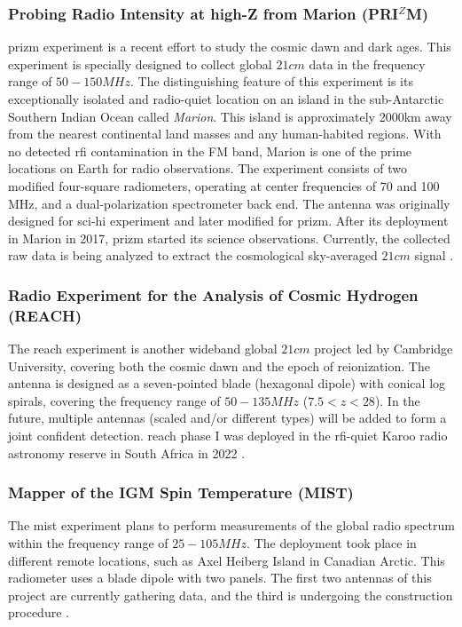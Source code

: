 \documentclass[12pt, TexShade, letterpaper]{report}
\begin{document}
\subsubsection{Probing Radio Intensity at high-Z from Marion (PRI$^Z$M)}
\gls{prizm} experiment is a recent effort to study the cosmic dawn and dark ages. This experiment is specially designed to collect global $21cm$ data in the frequency range of $50-150MHz$. The distinguishing feature of this experiment is its exceptionally isolated and radio-quiet location on an island in the sub-Antarctic Southern Indian Ocean called \emph{Marion}. This island is approximately 2000km away from the nearest continental land masses and any human-habited regions. With no detected \gls{rfi} contamination in the FM band, Marion is one of the prime locations on Earth for radio observations. The experiment consists of two modified four-square radiometers, operating at center frequencies of 70 and 100 MHz, and a dual-polarization spectrometer back end. The antenna was originally designed for \gls{sci-hi} experiment \cite{sci-hi_1, sci-hi_2} and later modified for \gls{prizm}. After its deployment in Marion in 2017, \gls{prizm} started its science observations. Currently, the collected raw data is being analyzed to extract the cosmological sky-averaged $21cm$ signal \cite{prizm_2017, prizm_thesis}.\par 

\subsubsection{Radio Experiment for the Analysis of Cosmic Hydrogen (REACH)}
The \gls{reach} experiment is another wideband global $21cm$ project led by Cambridge University, covering both the cosmic dawn and the epoch of reionization. The antenna is designed as a seven-pointed blade (hexagonal dipole) with conical log spirals, covering the frequency range of $50-135MHz$ ($7.5 < z < 28$). In the future, multiple antennas (scaled and/or different types) will be added to form a joint confident detection. \gls{reach} phase I was deployed in the \gls{rfi}-quiet Karoo radio astronomy reserve in South Africa in 2022 \cite{reach_z, reach, reach_design}. \par

\subsubsection{Mapper of the IGM Spin Temperature (MIST)}
The \gls{mist} experiment plans to perform measurements of the global radio spectrum within the frequency range of $25-105 MHz$. The deployment took place in different remote locations, such as Axel Heiberg Island in Canadian Arctic. This radiometer uses a blade dipole with two panels. The first two antennas of this project are currently gathering data, and the third is undergoing the construction procedure \cite{mist, mist_presentation, mist_website}.
\end{document}
